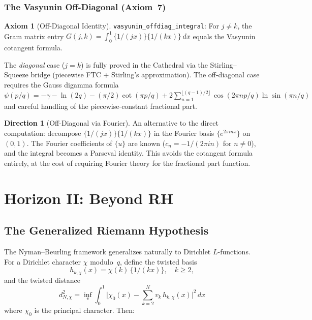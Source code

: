 \documentclass[11pt,a4paper]{article}
\theoremstyle{definition}
\newtheorem{axiombox}[definition]{Axiom}
\newtheorem{direction}[definition]{Direction}
\newcommand{\fract}[1]{\{#1\}}
\newcommand{\lean}[1]{\texttt{#1}}
\begin{document}
\subsubsection{The Vasyunin Off-Diagonal (Axiom~7)}

\begin{axiombox}[Off-Diagonal Identity]
\lean{vasyunin\_offdiag\_integral}: For $j \neq k$, the Gram matrix
entry $G(j,k) = \int_0^1 \{1/(jx)\}\{1/(kx)\}\,dx$ equals the
Vasyunin cotangent formula.
\end{axiombox}

The \emph{diagonal} case ($j = k$) is fully proved in the Cathedral via
the Stirling--Squeeze bridge (piecewise FTC + Stirling's approximation).
The off-diagonal case requires the Gauss digamma formula
$\psi(p/q) = -\gamma - \ln(2q) - (\pi/2)\cot(\pi p/q) +
2\sum_{n=1}^{\lfloor(q-1)/2\rfloor} \cos(2\pi np/q)\ln\sin(\pi n/q)$
and careful handling of the piecewise-constant fractional part.

\begin{direction}[Off-Diagonal via Fourier]
An alternative to the direct computation: decompose $\{1/(jx)\}\{1/(kx)\}$
in the Fourier basis $\{e^{2\pi inx}\}$ on $(0,1)$. The Fourier
coefficients of $\{u\}$ are known ($c_n = -1/(2\pi in)$ for $n \neq 0$),
and the integral becomes a Parseval identity. This avoids the cotangent
formula entirely, at the cost of requiring Fourier theory for the
fractional part function.
\end{direction}

\section{Horizon II: Beyond RH}
\label{sec:generalization}

\subsection{The Generalized Riemann Hypothesis}

The Nyman--Beurling framework generalizes naturally to Dirichlet
$L$-functions. For a Dirichlet character $\chi$ modulo~$q$, define the
twisted basis
\[
  h_{k,\chi}(x) = \chi(k)\,\fract{1/(kx)}, \quad k \ge 2,
\]
and the twisted distance
\[
  d_{N,\chi}^2 = \inf_v \int_0^1
    \biggl|\chi_0(x) - \sum_{k=2}^N v_k\,h_{k,\chi}(x)\biggr|^2\,dx
\]
where $\chi_0$ is the principal character. Then:
\end{document}
